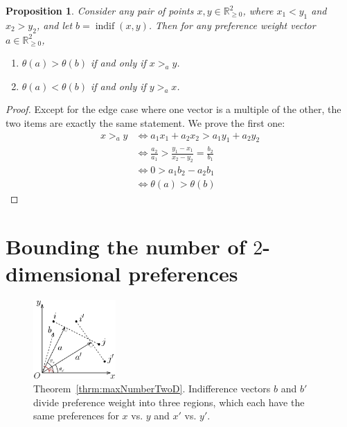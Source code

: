 \documentclass[12pt]{article}
\newtheorem{proposition}[theorem]{Proposition}
\newcommand{\R}{\mathbb{R}}
\newcommand{\Rgz}{\mathbb{R}_{\ge 0}}
\DeclareMathOperator*{\indif}{indif}
\newcommand{\1}[1]{\mathds{1}[{#1}]}
\begin{document}
    \begin{proposition} \label{prop:compEqualizerAngle}
      Consider any pair of points $x, y \in \Rgz^2$, 
      where $x_1 < y_1$ and $x_2 > y_2$, 
      and let $b = \indif(x,y)$.
      Then for any preference weight vector $a \in \R_{\geq 0}^2$,
      \begin{enumerate}
        \item \label{clm:angle1} $\theta(a) > \theta(b)$ if and only if $x >_a y$.
        \item \label{clm:angle2} $\theta(a) < \theta(b)$ if and only if $y >_a x$.
      \end{enumerate}
    \end{proposition}
    \begin{proof}
      Except for the edge case where one vector is a
      multiple of the other, the two items are exactly the same statement.
      We prove the first one:
      \begin{align*}
        x >_a y
        & \iff a_1 x_1 + a_2 x_2 > a_1 y_1 + a_2 y_2
        \\ & \iff \frac{a_2}{a_1} > \frac{y_1 - x_1}{x_2 - y_2} 
          = \frac{b_2}{b_1}
        \\ & \iff 0 > a_1 b_2 - a_2 b_1
        \\ & \iff \theta(a) > \theta(b)
      \end{align*}
    \end{proof}



\clearpage %
\section{Bounding the number of $2$-dimensional preferences}
    \begin{figure}
      \begin{center}
        \includegraphics[width=0.28\textwidth]{figures/lemSlopes}
      \end{center}
      \caption{
        Theorem~\ref{thrm:maxNumberTwoD}.
        Indifference vectors $b$ and $b'$ divide preference weight into three
        regions, which each have the same preferences for $x$ vs. $y$
        and $x'$ vs. $y'$.
      }
    \end{figure}
\end{document}
